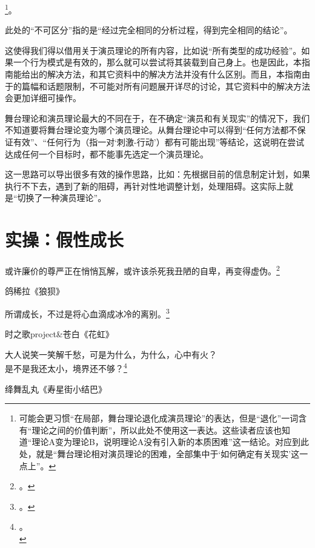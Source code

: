 \footnote{\trained 可能会更习惯“在局部，舞台理论退化成演员理论”的表达，但是“退化”一词含有“理论之间的价值判断”，所以此处不使用这一表达。这些读者应该也知道“理论A变为理论B，说明理论A没有引入新的本质困难”这一结论。对应到此处，就是“舞台理论相对演员理论的困难，全部集中于‘如何确定有关现实’这一点上”。}。
\begin{explain}
此处的“不可区分”指的是“经过完全相同的分析过程，得到完全相同的结论”。

这使得我们得以借用关于演员理论的所有内容，比如说“所有类型的成功经验”。如果一个行为模式是有效的，那么就可以尝试将其装载到自己身上。也是因此，本指南能给出的解决方法，和其它资料中的解决方法并没有什么区别。而且，本指南由于的篇幅和话题限制，不可能对所有问题展开详尽的讨论，其它资料中的解决方法会更加详细可操作。

舞台理论和演员理论最大的不同在于，在不确定“演员和有关现实”的情况下，我们不知道要将舞台理论变为哪个演员理论。从舞台理论中可以得到“任何方法都不保证有效”、“任何行为（指一对‘刺激-行动’）都有可能出现”等结论，这说明在尝试达成任何一个目标时，都不能事先选定一个演员理论。

这一思路可以导出很多有效的操作思路，比如：先根据目前的信息制定计划，如果执行不下去，遇到了新的阻碍，再针对性地调整计划，处理阻碍。这实际上就是“切换了一种演员理论”。
\end{explain}

\section{实操：假性成长\label{sec:假性成长}}
\hfill\begin{minipage}{0.6\textwidth}
\fontsize{8pt}{12pt}\selectfont\fontsize{8pt}{12pt}

\raggedright 或许廉价的尊严正在悄悄瓦解，或许该杀死我丑陋的自卑，再变得虚伪。\footnote{。}

\raggedleft 鸽稀拉《狼狈》

\raggedright 所谓成长，不过是将心血滴成冰冷的离别。\footnote{\another{}。}

\raggedleft 时之歌project\&苍白《花虹》

\raggedright 大人说笑一笑解千愁，可是为什么，为什么，心中有火？\\
是不是我还太小，境界还不够？\footnote{\another{}。\\}

\raggedleft 绛舞乱丸《寿星街小结巴》
\end{minipage}

